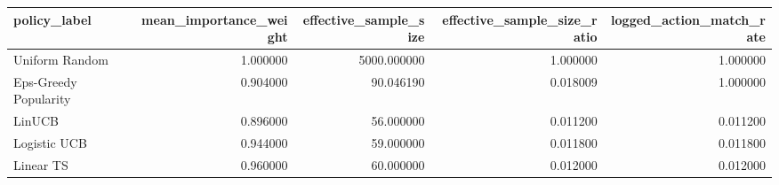 \begin{tabular}{lrrrr}
\toprule
policy\_label & mean\_importance\_weight & effective\_sample\_size & effective\_sample\_size\_ratio & logged\_action\_match\_rate \\
\midrule
Uniform Random & 1.000000 & 5000.000000 & 1.000000 & 1.000000 \\
Eps-Greedy Popularity & 0.904000 & 90.046190 & 0.018009 & 1.000000 \\
LinUCB & 0.896000 & 56.000000 & 0.011200 & 0.011200 \\
Logistic UCB & 0.944000 & 59.000000 & 0.011800 & 0.011800 \\
Linear TS & 0.960000 & 60.000000 & 0.012000 & 0.012000 \\
\bottomrule
\end{tabular}

